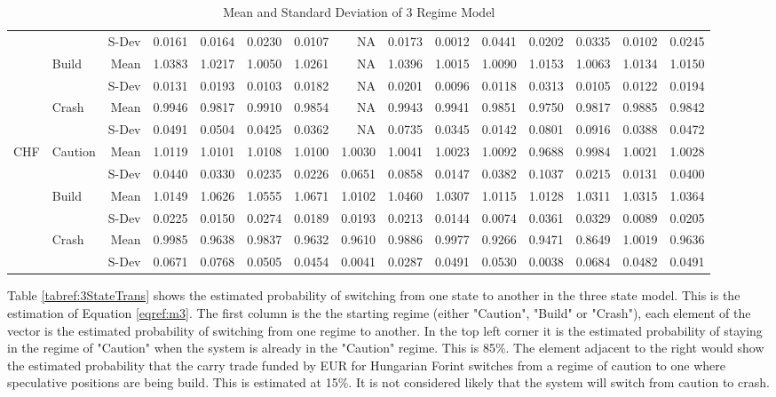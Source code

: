 \documentclass[12pt, a4paper, oneside]{article} %
\begin{document}
\begin{landscape}
\begin{table}[ht]
\begin{tabular}{llrrrrrrrrrrrrr}
  && S-Dev & 0.0161 & 0.0164 & 0.0230 & 0.0107 & NA & 0.0173 & 0.0012 & 0.0441 & 0.0202 & 0.0335 & 0.0102 & 0.0245\\ 
  & \multirow{2}{*}{Build} &  Mean & 1.0383 & 1.0217 & 1.0050 & 1.0261 & NA & 1.0396 & 1.0015 & 1.0090 & 1.0153 & 1.0063 & 1.0134 & 1.0150\\ 
  && S-Dev & 0.0131 & 0.0193 & 0.0103 & 0.0182 & NA & 0.0201 & 0.0096 & 0.0118 & 0.0313 & 0.0105 & 0.0122 & 0.0194\\ 
  & \multirow{2}{*}{Crash} & Mean & 0.9946 & 0.9817 & 0.9910 & 0.9854 & NA & 0.9943 & 0.9941 & 0.9851 & 0.9750 & 0.9817 & 0.9885 & 0.9842 \\ 
  &&S-Dev & 0.0491 & 0.0504 & 0.0425 & 0.0362 & NA & 0.0735 & 0.0345 & 0.0142 & 0.0801 & 0.0916 & 0.0388 & 0.0472\\ 
\hline
\multirow{6}{*}{CHF}& \multirow{2}{*}{Caution} & Mean & 1.0119 & 1.0101 & 1.0108 & 1.0100 & 1.0030 & 1.0041 & 1.0023 & 1.0092 & 0.9688 & 0.9984 & 1.0021 & 1.0028\\ 
  && S-Dev& 0.0440 & 0.0330 & 0.0235 & 0.0226 & 0.0651 & 0.0858 & 0.0147 & 0.0382 & 0.1037 & 0.0215 & 0.0131 & 0.0400\\ 
  & \multirow{2}{*}{Build} & Mean & 1.0149 & 1.0626 & 1.0555 & 1.0671 & 1.0102 & 1.0460 & 1.0307 & 1.0115 & 1.0128 & 1.0311 & 1.0315 & 1.0364\\ 
  && S-Dev & 0.0225 & 0.0150 & 0.0274 & 0.0189 & 0.0193 & 0.0213 & 0.0144 & 0.0074 & 0.0361 & 0.0329 & 0.0089 & 0.0205\\ 
  & \multirow{2}{*}{Crash} & Mean & 0.9985 & 0.9638 & 0.9837 & 0.9632 & 0.9610 & 0.9886 & 0.9977 & 0.9266 & 0.9471 & 0.8649 & 1.0019 & 0.9636 \\ 
  && S-Dev& 0.0671 & 0.0768 & 0.0505 & 0.0454 & 0.0041 & 0.0287 & 0.0491 & 0.0530 & 0.0038 & 0.0684 & 0.0482 & 0.0491\\ 
   \hline
\end{tabular}
\caption{Mean and Standard Deviation of 3 Regime Model}
\label{tabref:3StateProb}
\end{table}
\end{landscape}

Table \ref{tabref:3StateTrans} shows the estimated probability of switching from one state to another in the three state model.  This is the estimation of Equation \ref{eqref:m3}.  The first column is the  the starting regime (either "Caution", "Build" or "Crash"), each element of the vector is the estimated probability of switching from one regime to another. In the top left corner it is the estimated probability of staying in the regime of "Caution" when the system is already in the "Caution" regime.  This is 85\%.  The element adjacent to the right would show the estimated probability that the carry trade funded by EUR for Hungarian Forint switches from a regime of caution to one where speculative positions are being build.  This is estimated at 15\%.  It is not considered likely that the system will switch from caution to crash.  
\end{document}
